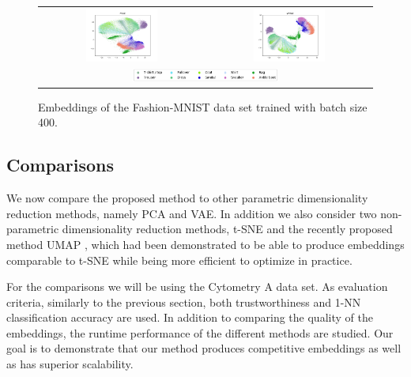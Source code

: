 \begin{figure}[!htb]
  \centering
  \begin{tabular}{cc}
    \includegraphics[width=0.45\textwidth]{images/fashion_mnist_ptsne_embedding.png} &
    \includegraphics[width=0.45\textwidth]{images/fashion_mnist_vptsne_embedding.png} \\
    \multicolumn{2}{c}{\includegraphics[width=0.45\textwidth]{images/fashion_mnist_legend.png}}
  \end{tabular}
  \caption{Embeddings of the Fashion-MNIST data set trained with batch size 400.}
  \label{fig:fashion_mnist_comparison}
\end{figure}

\subsection{Comparisons}
\label{section:comparisons}

We now compare the proposed method to other parametric dimensionality reduction methods, namely PCA and VAE. In addition we also consider two non-parametric dimensionality reduction methods, t-SNE and the recently proposed method UMAP \cite{umap}, which had been demonstrated to be able to produce embeddings comparable to t-SNE while being more efficient to optimize in practice.

For the comparisons we will be using the Cytometry A data set. As evaluation criteria, similarly to the previous section, both trustworthiness and 1-NN classification accuracy are used. In addition to comparing the quality of the embeddings, the runtime performance of the different methods are studied. Our goal is to demonstrate that our method produces competitive embeddings as well as has superior scalability.

